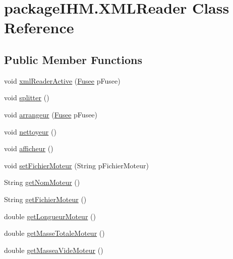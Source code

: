 \hypertarget{classpackage_i_h_m_1_1_x_m_l_reader}{}\section{package\+I\+H\+M.\+X\+M\+L\+Reader Class Reference}
\label{classpackage_i_h_m_1_1_x_m_l_reader}
\subsection*{Public Member Functions}
\begin{DoxyCompactItemize}
\item 
void \mbox{\hyperlink{classpackage_i_h_m_1_1_x_m_l_reader_a4969a78a69e9f65472e7dfc40689baac}{xml\+Reader\+Active}} (\mbox{\hyperlink{classpackage_i_h_m_1_1_fusee}{Fusee}} p\+Fusee)
\item 
void \mbox{\hyperlink{classpackage_i_h_m_1_1_x_m_l_reader_a08e6efd00cdf8f85131c9e7aceaebea7}{splitter}} ()
\item 
void \mbox{\hyperlink{classpackage_i_h_m_1_1_x_m_l_reader_a2d78bb962cb1fd2e06a795d618be108c}{arrangeur}} (\mbox{\hyperlink{classpackage_i_h_m_1_1_fusee}{Fusee}} p\+Fusee)
\item 
void \mbox{\hyperlink{classpackage_i_h_m_1_1_x_m_l_reader_ae9dc6ed02613319fc885578d6de256ce}{nettoyeur}} ()
\item 
void \mbox{\hyperlink{classpackage_i_h_m_1_1_x_m_l_reader_a30ae12374f7f3756f98903c447d5c447}{afficheur}} ()
\item 
void \mbox{\hyperlink{classpackage_i_h_m_1_1_x_m_l_reader_a99610d65956379d3d7a18529bb586fff}{set\+Fichier\+Moteur}} (String p\+Fichier\+Moteur)
\item 
String \mbox{\hyperlink{classpackage_i_h_m_1_1_x_m_l_reader_a52e92b3352087c0671df19ce077c1b4e}{get\+Nom\+Moteur}} ()
\item 
String \mbox{\hyperlink{classpackage_i_h_m_1_1_x_m_l_reader_abf33606918b241db1a460d584f1a5723}{get\+Fichier\+Moteur}} ()
\item 
double \mbox{\hyperlink{classpackage_i_h_m_1_1_x_m_l_reader_a4078157e5154dbcbd144d0d392932794}{get\+Longueur\+Moteur}} ()
\item 
double \mbox{\hyperlink{classpackage_i_h_m_1_1_x_m_l_reader_aabb838637b0d576ee8913cf0b6eb3ca3}{get\+Masse\+Totale\+Moteur}} ()
\item 
double \mbox{\hyperlink{classpackage_i_h_m_1_1_x_m_l_reader_ab57b1b50cc2cf5b89f6358a336a96148}{get\+Massea\+Vide\+Moteur}} ()

\end{DoxyCompactItemize}
